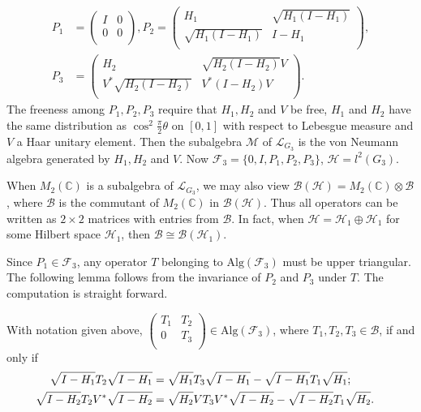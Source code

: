 \documentclass{pnastwo}
\newcommand{\B}{\mathcal B}
\newcommand{\F}{\mathcal F}
\newcommand{\HHH}{\mathcal H} %
\newcommand{\LLL}{\mathcal L} %
\newcommand{\M}{\mathcal M}
\newcommand{\Alg}{\mathrm{Alg}}
\newcommand{\C}{\mathbb C} %
\begin{document}
\begin{article}
\begin{align*}
P_1&= \left(
        \begin{array}{cc}
          I & 0 \\
          0 & 0 \\
        \end{array}
      \right),
P_{2} = \left(
          \begin{array}{cc}
            H_{1} & \sqrt{H_{1}(I-H_{1})} \\
            \sqrt{H_{1}(I-H_{1})} & I-H_{1} \\
          \end{array}
        \right) , \\
P_{3}&= \left(
          \begin{array}{cc}
            H_{2} & \sqrt{H_{2}(I-H_{2})}V \\
            V^{*}\sqrt{H_{2}(I-H_{2})} & V^{*}(I-H_{2})V \\
          \end{array}
        \right) \mbox{.}
\end{align*}
The freeness among $P_1,P_2,P_3$ require that $H_1, H_2$ and $V$
be free, $H_1$ and $H_2$ have the same distribution as
$\cos^2\frac{\pi}2\theta$ on $[0,1]$ with respect to Lebesgue
measure and $V$ a Haar unitary element. Then the subalgebra $\M$
of $\LLL_{G_3}$ is the von Neumann algebra generated by $H_1,H_2$
and $V$. Now $\F_3=\{0,I, P_1, P_2, P_3\}$, $\HHH=l^2(G_3)$.

When $M_2(\C)$ is a subalgebra of $\LLL_{G_3}$, we may also view
$\B(\HHH)=M_2(\C)\otimes \B$, where $\B$ is the commutant of
$M_2(\C)$ in $\B(\HHH)$. Thus all operators can be written as
$2\times 2$ matrices with entries from $\B$. In fact, when
$\HHH=\HHH_1\oplus \HHH_1$ for some Hilbert space $\HHH_1$, then
$\B\cong\B(\HHH_1)$.

Since $P_1\in\F_3$, any operator $T$ belonging to $\Alg(\F_3)$
must be upper triangular. The following lemma follows from the
invariance of $P_2$ and $P_3$ under $T$. The computation is
straight forward.

\begin{lemma}
With notation given above, $\left(
                  \begin{array}{cc}
                    T_{1} & T_{2} \\
                    0 & T_{3} \\
                  \end{array}
                \right)\in\Alg(\F_3)$, where $
T_1, T_2, T_3\in\B$, if and only if \begin{align*}
\sqrt{I-H_1}T_2\sqrt{I-H_1} &= \sqrt{H_1}T_3
\sqrt{I-H_1}-\sqrt{I-H_1}T_1\sqrt{H_1};\cr
 \sqrt{I-H_2}T_2V^*\sqrt{I-H_2}
&= \sqrt{H_2}VT_3 V^*\sqrt{I-H_2}-\sqrt{I-H_2}T_1\sqrt{H_2}.
\end{align*}
\end{lemma}


\end{article}
\end{document}
